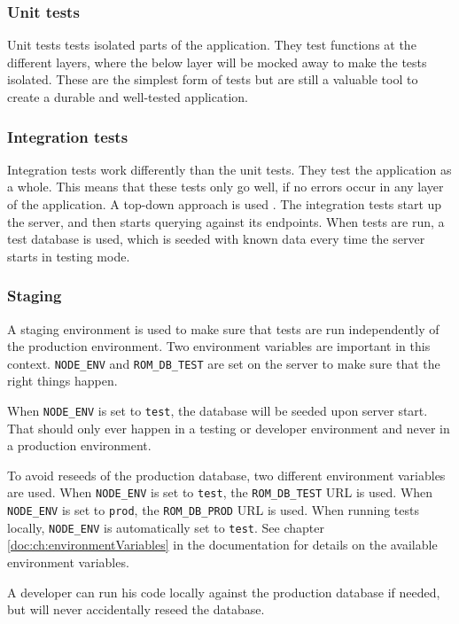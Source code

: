 \subsubsection{Unit tests}
Unit tests tests isolated parts of the application. 
They test functions at the different layers, where the below layer will be mocked away to make the tests isolated.
These are the simplest form of tests but are still a valuable tool to create a durable and well-tested application.

\subsubsection{Integration tests}
Integration tests work differently than the unit tests. 
They test the application as a whole. 
This means that these tests only go well, if no errors occur in any layer of the application. 
A top-down approach is used \citep[pp. 662-669]{testing:integration}.
The integration tests start up the  server, and then starts querying against its endpoints. 
When tests are run, a test database is used, which is seeded with known data every time the server starts in testing mode.

\subsubsection{Staging}
\label{sec:staging}
A staging environment is used to make sure that tests are run independently of the production environment. 
Two environment variables are important in this context.
\verb+NODE_ENV+ and \verb+ROM_DB_TEST+ are set on the  server to make sure that the right things happen.

When \verb+NODE_ENV+ is set to \verb+test+, the database will be seeded upon server start.
That should only ever happen in a testing or developer environment and never in a production environment.

To avoid reseeds of the production database, two different environment variables are used.
When \verb+NODE_ENV+ is set to \verb+test+, the \verb+ROM_DB_TEST+ URL is used. 
When \verb+NODE_ENV+ is set to \verb+prod+, the \verb+ROM_DB_PROD+ URL is used. 
When running tests locally, \verb+NODE_ENV+ is automatically set to \verb+test+.
See chapter \ref{doc:ch:environmentVariables} in the documentation for details on the available environment variables.

A developer can run his code locally against the production database if needed, but will never accidentally reseed the database.


